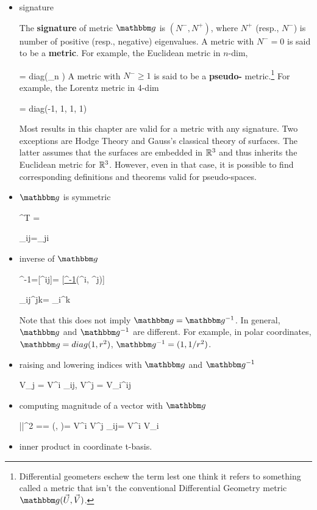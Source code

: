 \begin{itemize}

\item signature

The {\bf signature} of metric $\metric$
is $(N^-, N^+)$, where $N^+$ (resp., $N^-$)
is  number of positive (resp., negative) eigenvalues. A metric 
with $N^-=0$ is  said to be 
a {\bf \Rien metric}.
For example, the Euclidean metric
in $n$-dim,
 
\beq\metric = diag(_{n })\eeq
 A metric with
$N^-\geq 1$ is said
to be a {\bf pseudo- \Rien} metric.\footnote{Differential
geometers eschew the term   lest one think
it refers to something
called a metric that isn't
the conventional Differential Geometry metric $\metric(\vecU, \vecV)$.}
For example, the 
Lorentz metric 
in 4-dim 

\beq
\metric= diag(-1, 1, 1, 1)
\eeq

Most results in this chapter
are valid for a metric
with any signature. 
Two exceptions are Hodge Theory and 
Gauss's classical theory
of surfaces. The latter assumes that
the surfaces are embedded in ${ \mathbb{R}}^3$ and thus inherits the
Euclidean metric for ${ \mathbb{R}}^3$.
However, even in that case,
it is possible to 
find corresponding definitions
and theorems valid for
pseudo-\Rien spaces.


\item $\metric$ is symmetric

\beq
\metric^T  =\metric
\eeq

\beq
\metric_{ij}=\metric_{ji}
\eeq
\item inverse of $\metric$

\beq
\metric^{-1}=[\metric^{ij}]=
[\ul{\metric^{-1}}(\ul{\chi}^i, \ul{\chi}^j)]
\eeq

\beq
\metric_{ij}\metric^{jk}= \delta_i^k
\eeq

Note that this does not imply $\metric=\metric^{-1}$.
In general, $\metric$ and $\metric^{-1}$ are different.
For example, in polar 
coordinates, $\metric=diag(1, r^2)$, $\metric^{-1}= (1, 1/r^2)$.

\item raising and lowering indices with $\metric$
and $\metric^{-1}$

\beq
V_j = V^i \metric_{ij},\quad
V^j = V_i\metric^{ij}
\eeq

\item computing magnitude of a vector with $\metric$

\beq
|\vecV|^2 
=\av{\vecV, \vecV}= \metric(\vecV, \vecV)=
V^i V^j \metric_{ij}= V^i V_i
\eeq
\item inner product
in coordinate t-basis.


\end{itemize}
